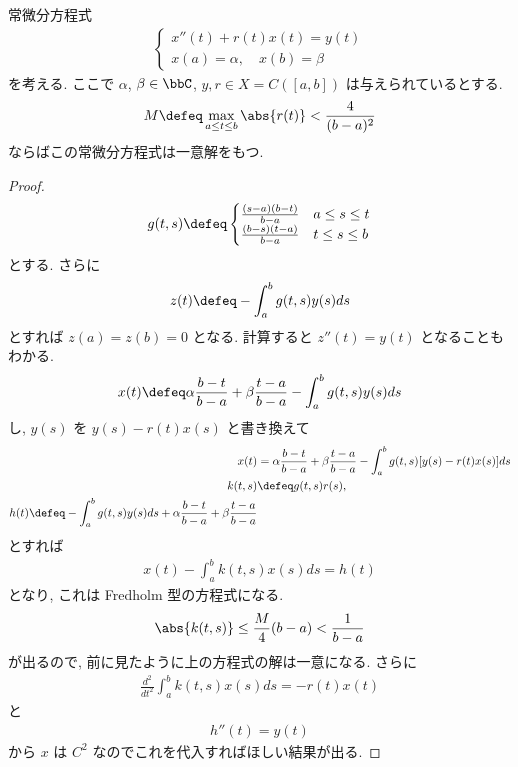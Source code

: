 \documentclass[openany, a4paper, oneside]{jsbook}
\begin{document}
\begin{thm}[常微分方程式の境界値問題]
常微分方程式
\begin{align}
 \begin{cases}
  x''(t) + r(t) x(t) = y(t) \\
  x(a) = \alpha, \quad x(b) = \beta
 \end{cases}
\end{align}
を考える.
ここで $\alpha$, $\beta \in \bbC$, $y, r \in X = C([a, b])$ は与えられているとする.
\begin{align}
 M
 \defeq
 \max_{a \leq t \leq b} \abs{r(t)}
 <
 \frac{4}{(b-a)^2}
\end{align}
ならばこの常微分方程式は一意解をもつ.
\end{thm}
\begin{proof}
\begin{align}
 g(t, s)
 \defeq
 \begin{cases}
  \frac{(s-a)(b-t)}{b-a} & a \leq s \leq t \\
  \frac{(b-s)(t-a)}{b-a} & t \leq s \leq b
 \end{cases}
\end{align}
とする.
さらに
\begin{align}
 z(t)
 \defeq
 -\int_a^b g(t, s) y(s) ds
\end{align}
とすれば $z(a) = z(b) = 0$ となる.
計算すると $z''(t) = y(t)$ となることもわかる.
\begin{align}
 x(t)
 \defeq
 \alpha \frac{b-t}{b-a} + \beta \frac{t-a}{b-a}
 -\int_a^b g(t,s) y(s) ds
\end{align}
し, $y(s)$ を $y(s)-r(t)x(s)$ と書き換えて
\begin{align}
 x(t)
 &=
 \alpha \frac{b-t}{b-a} + \beta \frac{t-a}{b-a} - \int_a^b g(t,s)[y(s)-r(t)x(s)] ds \\
 k(t, s)
 &\defeq
 g(t, s) r(s), \\
 h(t)
 \defeq
 -\int_a^b g(t, s) y(s) ds + \alpha \frac{b-t}{b-a} + \beta \frac{t-a}{b-a}
\end{align}
とすれば
\begin{align}
 x(t) - \int_a^b k(t, s) x(s)ds
 =
 h(t)
\end{align}
となり, これは Fredholm 型の方程式になる.
\begin{align}
 \abs{k(t, s)}
 \leq
 \frac{M}{4}(b-a)
 < \frac{1}{b-a}
\end{align}
が出るので, 前に見たように上の方程式の解は一意になる.
さらに
\begin{align}
 \frac{d^2}{dt^2} \int_a^b k(t, s) x(s) ds
 =
 -r(t) x(t)
\end{align}
と
\begin{align}
 h''(t) = y(t)
\end{align}
から $x$ は $C^2$ なのでこれを代入すればほしい結果が出る.
\end{proof}
\end{document}
